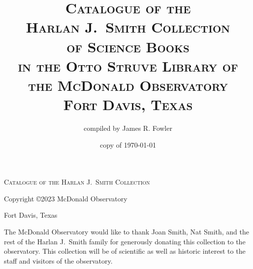 \documentclass[letterpaper]{book}
\begin{document}
\frontmatter
\thispagestyle{empty}
\vspace*{1 in}
\begin{centering}
  \textsc{\Large Catalogue of the Harlan J.~Smith Collection}
\end{centering}
\newpage

\thispagestyle{empty}
\title{\textsc{Catalogue of the \\
    Harlan J.\ Smith Collection \\
    of Science Books \\
    in the Otto Struve Library of \\
    the McDonald Observatory \\
    Fort Davis, Texas}}
\author{compiled by James R. Fowler}
\date{copy of \today}
\maketitle
\newpage
\thispagestyle{empty}
\vspace*{5 in}
\centerline{Copyright \copyright 2023 McDonald Observatory}
\centerline{Fort Davis, Texas}
\newpage

\thispagestyle{empty}
\noindent
The McDonald Observatory would like to thank Joan Smith,
Nat Smith, and the rest of the Harlan J.~Smith family
for generously donating this collection to the observatory.
This collection will be of scientific as well as historic
interest to the staff and visitors of the observatory.
\restoregeometry
\newpage
\end{document}
